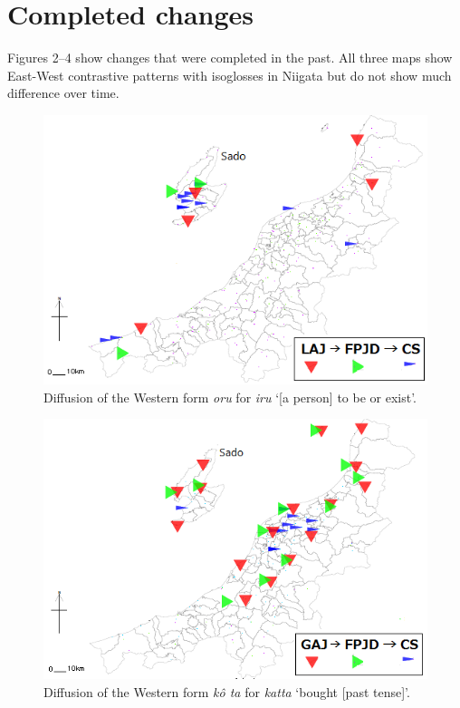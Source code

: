 \documentclass[output=paper]{LSP/langsci}
\begin{document}
\section{Completed changes}

Figures 2--4 show changes that were completed in the past.  All three maps show East-West contrastive patterns with isoglosses in Niigata but do not show much difference over time.

\begin{figure}
\includegraphics[width=.75\textwidth]{illustrations/fuku2_fig2a}
\caption{Diffusion of the Western form \textit{oru} for \textit{iru} `[a person] to be or exist'.}
\label{fig:fuku:2a}
\end{figure}

\begin{figure}
\includegraphics[width=.75\textwidth]{illustrations/fuku2_fig2b}
\caption{Diffusion of the Western form \textit{k\^{o}
ta} for \textit{katta} `bought [past tense]'.}
\label{fig:fuku:2b}
\end{figure}
\end{document}
